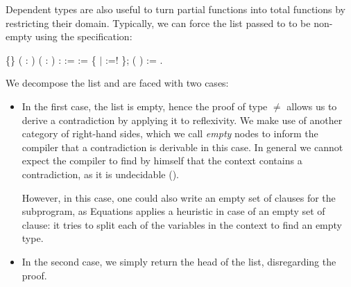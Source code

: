    Dependent types are also useful to turn partial functions into total functions by
   restricting their domain. Typically, we can force the list passed to  
   to be non-empty using the specification:
\begin{coqdoccode}
\coqdocemptyline
\coqdocnoindent
{}  \{\} ( :  ) ( :   ) :  :=\coqdoceol
\coqdocnoindent
{}      := \{ \ensuremath{|}  :=!  \};\coqdoceol
\coqdocnoindent
{} (  ) \coqdocvar{\_} := .\coqdoceol
\coqdocemptyline
\end{coqdoccode}
We decompose the list and are faced with two cases:



\begin{itemize}
\item  In the first case, the list is empty, hence the proof  of type
      \ensuremath{\not=}  allows us to derive a contradiction by applying it to
     reflexivity.  We make use of another category of right-hand sides,
     which we call \textit{empty} nodes to inform the compiler that a
     contradiction is derivable in this case.  In general we cannot
     expect the compiler to find by himself that the context contains a
     contradiction, as it is undecidable
     (\cite{DBLP:conf/plpv/Oury07,DBLP:conf/birthday/GoguenMM06}).


     However, in this case, one could also write an empty set of clauses
     for the  subprogram, as Equations applies a heuristic in case
     of an empty set of clause: it tries to split each of the variables
     in the context to find an empty type.



\item  In the second case, we simply return the head of the list,
     disregarding the proof.  
\end{itemize}


